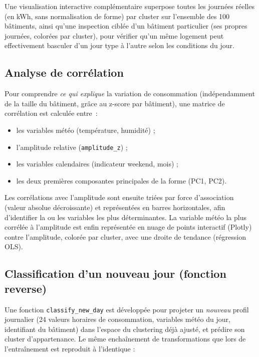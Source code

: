 \documentclass[11pt,a4paper]{article}
\newcommand{\code}[1]{\texttt{#1}}
\begin{document}
Une visualisation interactive complémentaire superpose toutes les journées réelles (en kWh,
sans normalisation de forme) par cluster sur l'ensemble des 100 bâtiments, ainsi qu'une
inspection ciblée d'un bâtiment particulier (ses propres journées, colorées par cluster), pour
vérifier qu'un même logement peut effectivement basculer d'un jour type à l'autre selon les
conditions du jour.

\subsection{Analyse de corrélation}

Pour comprendre \emph{ce qui explique} la variation de consommation (indépendamment de la
taille du bâtiment, grâce au z-score par bâtiment), une matrice de corrélation est calculée
entre~:

\begin{itemize}
    \item les variables météo (température, humidité) ;
    \item l'amplitude relative (\code{amplitude\_z}) ;
    \item les variables calendaires (indicateur weekend, mois) ;
    \item les deux premières composantes principales de la forme (PC1, PC2).
\end{itemize}

Les corrélations avec l'amplitude sont ensuite triées par force d'association (valeur absolue
décroissante) et représentées en barres horizontales, afin d'identifier la ou les variables les
plus déterminantes. La variable météo la plus corrélée à l'amplitude est enfin représentée en
nuage de points interactif (Plotly) contre l'amplitude, colorée par cluster, avec une droite de
tendance (régression OLS).

\subsection{Classification d'un nouveau jour (fonction \og{}reverse\fg{})}

Une fonction \code{classify\_new\_day} est développée pour projeter un \emph{nouveau} profil
journalier (24 valeurs horaires de consommation, variables météo du jour, identifiant du
bâtiment) dans l'espace du clustering déjà ajusté, et prédire son cluster d'appartenance. Le
même enchaînement de transformations que lors de l'entraînement est reproduit à l'identique :
\end{document}
